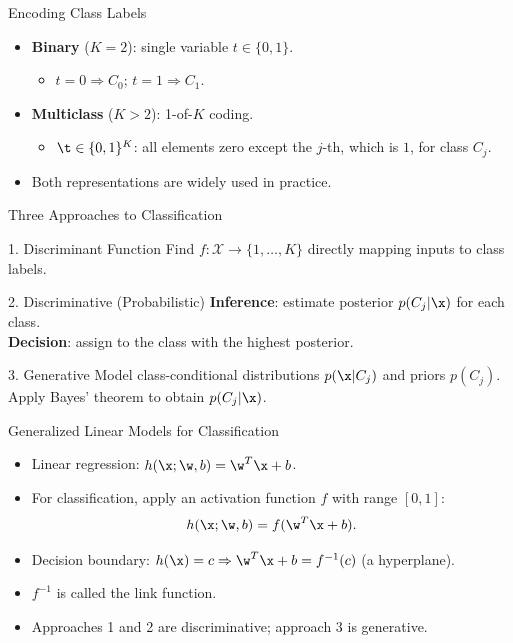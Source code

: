 \begin{frame}{Encoding Class Labels}
  \begin{itemize}
    \item \textbf{Binary} ($K = 2$): single variable $t \in \{0, 1\}$.
      \begin{itemize}
        \item $t = 0 \Rightarrow C_0$; \quad $t = 1 \Rightarrow C_1$.
      \end{itemize}
    \item \textbf{Multiclass} ($K > 2$): \alert{1-of-$K$ coding}.
      \begin{itemize}
        \item $\t \in \{0,1\}^K$: all elements zero except the $j$-th, which is $1$, for class $C_j$.
      \end{itemize}
    \item Both representations are widely used in practice.
  \end{itemize}
\end{frame}

\begin{frame}{Three Approaches to Classification}
  \begin{block}{1. Discriminant Function}
    Find $f:\mathcal{X}\to\{1,\ldots,K\}$ directly mapping inputs to class labels.
  \end{block}
  \vspace{0.4em}
  \begin{block}{2. Discriminative (Probabilistic)}
    \textbf{Inference}: estimate posterior $p(C_j|\x)$ for each class.\\
    \textbf{Decision}: assign to the class with the highest posterior.
  \end{block}
  \vspace{0.4em}
  \begin{block}{3. Generative}
    Model class-conditional distributions $p(\x|C_j)$ and priors $p(C_j)$.\\
    Apply Bayes' theorem to obtain $p(C_j|\x)$.
  \end{block}
\end{frame}

\begin{frame}{Generalized Linear Models for Classification}
  \begin{itemize}
    \item Linear regression: $h(\x;\w,b) = \w^T\x + b$.
    \item For classification, apply an \alert{activation function} $f$ with range $[0,1]$:
    \[
      h(\x;\w,b) = f(\w^T\x + b).
    \]
    \item Decision boundary: $h(\x) = c \Rightarrow \w^T\x + b = f^{-1}(c)$ \quad (a hyperplane).
    \item $f^{-1}$ is called the \alert{link function}.
    \item Approaches 1 and 2 are \alert{discriminative}; approach 3 is \alert{generative}.
  \end{itemize}
\end{frame}

